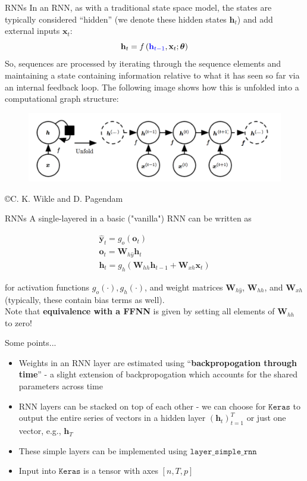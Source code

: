 \documentclass{beamer}
\begin{document}
\begin{frame}{RNNs}
In an RNN, as with a traditional state space model, the states are typically considered ``hidden'' (we denote these hidden states $\mathbf{h}_{t}$) and add external inputs $\mathbf{x}_{t}$:
$$
\mathbf{h}_{t}=f\left(\textcolor{blue}{\mathbf{h}_{t-1}}, \mathbf{x}_{t} ; \boldsymbol{\theta}\right)
$$
So, sequences are processed by iterating through the sequence elements and maintaining a state containing information relative to what it has seen so far via an internal feedback loop. The following image shows how this is unfolded into a computational graph structure:
\begin{figure}
\includegraphics[width=0.86\linewidth]{Images/RNN1.png}
\end{figure}
\centering \copyright C. K. Wikle and D. Pagendam 
\end{frame}
\begin{frame}{RNNs}
A single-layered in a basic ("vanilla") RNN can be written as

$$
\begin{gathered}
\hat{\mathbf{y}}_{t}=g_{o}\left(\mathbf{o}_{t}\right) \\
\mathbf{o}_{t}=\mathbf{W}_{h \hat{y}} \mathbf{h}_{t} \\
\mathbf{h}_{t}=g_{h}\left(\mathbf{W}_{h h} \mathbf{h}_{t-1}+\mathbf{W}_{x h} \mathbf{x}_{t}\right)
\end{gathered}
$$

for activation functions $g_{o}(\cdot), g_{h}(\cdot)$, and weight matrices $\mathbf{W}_{h \hat{y}}$, $\mathbf{W}_{h h}$, and $\mathbf{W}_{x h}$ (typically, these contain bias terms as well).\\
Note that \textbf{equivalence with a FFNN} is given by setting all elements of $\mathbf{W}_{h h}$ to zero!

\end{frame}
 
\begin{frame}{Some points...}
\begin{itemize}
\item Weights in an RNN layer are estimated using ``\textbf{backpropogation through time}'' - a slight extension of backpropogation which accounts for the shared parameters across time
\item RNN layers can be stacked on top of each other - we can choose for $\texttt{Keras}$ to output the entire series of vectors in a hidden layer $(\mathbf{h}_t)^T_{t=1}$ or just one vector, e.g.,  $\mathbf{h}_T$
\item These simple layers can be implemented using $\texttt{layer\_simple\_rnn}$
\item Input into $\texttt{Keras}$ is a tensor with axes $[n,T,p]$
\end{itemize}
\end{frame}
\end{document}
